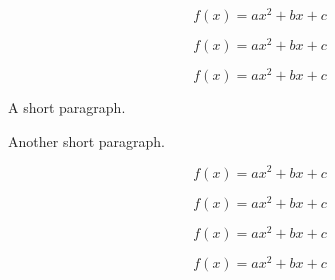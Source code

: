 \documentclass{article}
\begin{document}
\lipsum[1]

\begin{equation}
	f(x)=ax^2+bx+c
\end{equation}


\lipsum[2]

\begin{equation}
	f(x)=ax^2+bx+c
\end{equation}


\lipsum[3]

\begin{equation}
	f(x)=ax^2+bx+c
\end{equation}


\lipsum[4]

A short paragraph.

Another short paragraph.

\begin{equation}
	f(x)=ax^2+bx+c
\end{equation}


\lipsum[5]

\begin{equation}
	f(x)=ax^2+bx+c
\end{equation}


\lipsum[6]

\begin{equation}
	f(x)=ax^2+bx+c
\end{equation}


\lipsum[7]

\begin{equation}
	f(x)=ax^2+bx+c
\end{equation}
\end{document}
